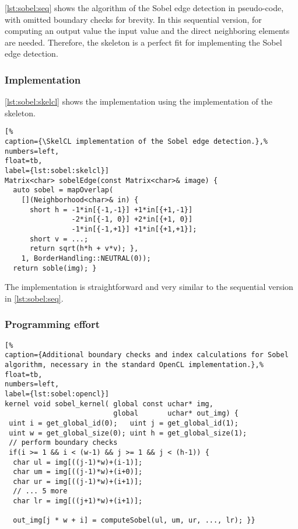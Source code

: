 \autoref{lst:sobel:seq} shows the algorithm of the Sobel edge detection in pseudo-code, with omitted boundary checks for brevity.
In this sequential version, for computing an output value  the input value  and the direct neighboring elements are needed.
Therefore, the \stencil skeleton is a perfect fit for implementing the Sobel edge detection.

\subsubsection*{\SkelCL Implementation}
\autoref{lst:sobel:skelcl} shows the \SkelCL implementation using the  implementation of the \stencil skeleton.
%
\begin{lstlisting}[%
caption={\SkelCL implementation of the Sobel edge detection.},%
numbers=left,
float=tb,
label={lst:sobel:skelcl}]
Matrix<char> sobelEdge(const Matrix<char>& image) {
  auto sobel = mapOverlap(
    [](Neighborhood<char>& in) {
      short h = -1*in[{-1,-1}] +1*in[{+1,-1}]
                -2*in[{-1, 0}] +2*in[{+1, 0}]
                -1*in[{-1,+1}] +1*in[{+1,+1}];
      short v = ...;
      return sqrt(h*h + v*v); },
    1, BorderHandling::NEUTRAL(0));
  return soble(img); }
\end{lstlisting}
%
The implementation is straightforward and very similar to the sequential version in \autoref{lst:sobel:seq}.

\subsubsection*{Programming effort}

\begin{lstlisting}[%
caption={Additional boundary checks and index calculations for Sobel algorithm, necessary in the standard OpenCL implementation.},%
float=tb,
numbers=left,
label={lst:sobel:opencl}]
kernel void sobel_kernel( global const uchar* img,
                          global       uchar* out_img) {
 uint i = get_global_id(0);   uint j = get_global_id(1);
 uint w = get_global_size(0); uint h = get_global_size(1);
 // perform boundary checks
 if(i >= 1 && i < (w-1) && j >= 1 && j < (h-1)) {
  char ul = img[((j-1)*w)+(i-1)];
  char um = img[((j-1)*w)+(i+0)];
  char ur = img[((j-1)*w)+(i+1)];
  // ... 5 more
  char lr = img[((j+1)*w)+(i+1)];

  out_img[j * w + i] = computeSobel(ul, um, ur, ..., lr); }}
\end{lstlisting}

